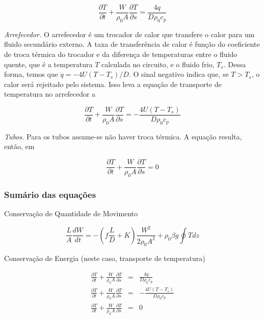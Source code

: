 \documentclass[a4paper,portuguese,10pt]{article}
\renewcommand{\D}{\partial}
\begin{document}
\begin{equation}
  \frac{\D T}{\D t}+\frac{W}{\rho_0A}\frac{\D T}{\D s} = \frac{4q}{D\rho_0c_p}
\end{equation}

{\it Arrefecedor.} O arrefecedor é um trocador de calor que transfere o calor para um fluido secundário externo. A taxa de transferência de calor é função do coeficiente de troca térmica do trocador e da diferença de temperaturas entre o fluido quente, que é a temperatura $T$ calculada no circuito, e o fluido frio, $T_s$. Dessa forma, temos que $\dot{q}=-4U(T-T_s)/D$. O sinal negativo indica que, se $T>T_s$, o calor será rejeitado pelo sistema. Isso leva a equação de transporte de temperatura no arrefecedor a

\begin{equation}
  \frac{\D T}{\D t}+\frac{W}{\rho_0A}\frac{\D T}{\D s} = -\frac{4U(T-T_s)}{D\rho_0c_p}
\end{equation}

{\it Tubos.} Para os tubos assume-se não haver troca térmica. A equação resulta, então, em

\begin{equation}
  \frac{\D T}{\D t}+\frac{W}{\rho_0A}\frac{\D T}{\D s} = 0
\end{equation}

\subsubsection{Sumário das equações}

Conservação de Quantidade de Movimento

\begin{equation}
  \frac{L}{A}\frac{dW}{dt} = -\left(f\frac{L}{D}+K\right)\frac{W^2}{2\rho_0A^2} + \rho_0\beta g\oint Tdz
\label{eq_momentum}
\end{equation}

Conservação de Energia (neste caso, transporte de temperatura)

\begin{subequations}
\begin{eqnarray}
  \frac{\D T}{\D t}+\frac{W}{\rho_0A}\frac{\D T}{\D s} &=& \frac{4q}{D\rho_0c_p}\\
  \frac{\D T}{\D t}+\frac{W}{\rho_0A}\frac{\D T}{\D s} &=& -\frac{4U(T-T_s)}{D\rho_0c_p}\\
  \frac{\D T}{\D t}+\frac{W}{\rho_0A}\frac{\D T}{\D s} &=& 0
\label{eq_energy}
\end{eqnarray}
\end{subequations}
\end{document}
